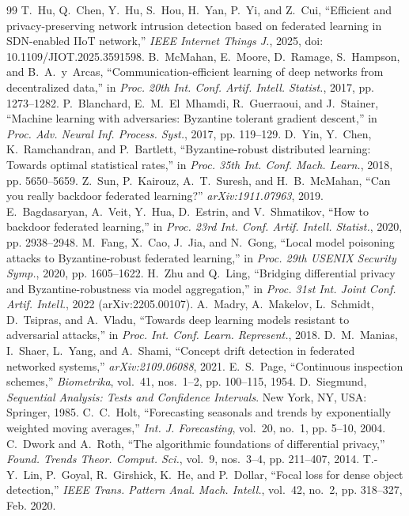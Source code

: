 \documentclass[journal]{IEEEtran}
\begin{document}
\begin{thebibliography}{99}
 T.~Hu, Q.~Chen, Y.~Hu, S.~Hou, H.~Yan, P.~Yi, and Z.~Cui, ``Efficient and privacy-preserving network intrusion detection based on federated learning in SDN-enabled IIoT network,'' \emph{IEEE Internet Things J.}, 2025, doi: 10.1109/JIOT.2025.3591598.
 B.~McMahan, E.~Moore, D.~Ramage, S.~Hampson, and B.~A.~y~Arcas, ``Communication-efficient learning of deep networks from decentralized data,'' in \emph{Proc. 20th Int. Conf. Artif. Intell. Statist.}, 2017, pp. 1273--1282.
 P.~Blanchard, E.~M.~El~Mhamdi, R.~Guerraoui, and J.~Stainer, ``Machine learning with adversaries: Byzantine tolerant gradient descent,'' in \emph{Proc. Adv. Neural Inf. Process. Syst.}, 2017, pp. 119--129.
 D.~Yin, Y.~Chen, K.~Ramchandran, and P.~Bartlett, ``Byzantine-robust distributed learning: Towards optimal statistical rates,'' in \emph{Proc. 35th Int. Conf. Mach. Learn.}, 2018, pp. 5650--5659.
 Z.~Sun, P.~Kairouz, A.~T.~Suresh, and H.~B.~McMahan, ``Can you really backdoor federated learning?'' \emph{arXiv:1911.07963}, 2019.
 E.~Bagdasaryan, A.~Veit, Y.~Hua, D.~Estrin, and V.~Shmatikov, ``How to backdoor federated learning,'' in \emph{Proc. 23rd Int. Conf. Artif. Intell. Statist.}, 2020, pp. 2938--2948.
 M.~Fang, X.~Cao, J.~Jia, and N.~Gong, ``Local model poisoning attacks to Byzantine-robust federated learning,'' in \emph{Proc. 29th USENIX Security Symp.}, 2020, pp. 1605--1622.
 H.~Zhu and Q.~Ling, ``Bridging differential privacy and Byzantine-robustness via model aggregation,'' in \emph{Proc. 31st Int. Joint Conf. Artif. Intell.}, 2022 (arXiv:2205.00107).
 A.~Madry, A.~Makelov, L.~Schmidt, D.~Tsipras, and A.~Vladu, ``Towards deep learning models resistant to adversarial attacks,'' in \emph{Proc. Int. Conf. Learn. Represent.}, 2018.
 D.~M.~Manias, I.~Shaer, L.~Yang, and A.~Shami, ``Concept drift detection in federated networked systems,'' \emph{arXiv:2109.06088}, 2021.
 E.~S.~Page, ``Continuous inspection schemes,'' \emph{Biometrika}, vol.~41, nos.~1--2, pp. 100--115, 1954.
 D.~Siegmund, \emph{Sequential Analysis: Tests and Confidence Intervals}. New York, NY, USA: Springer, 1985.
 C.~C.~Holt, ``Forecasting seasonals and trends by exponentially weighted moving averages,'' \emph{Int. J. Forecasting}, vol.~20, no.~1, pp. 5--10, 2004.
 C.~Dwork and A.~Roth, ``The algorithmic foundations of differential privacy,'' \emph{Found. Trends Theor. Comput. Sci.}, vol.~9, nos.~3--4, pp. 211--407, 2014.
 T.-Y.~Lin, P.~Goyal, R.~Girshick, K.~He, and P.~Dollar, ``Focal loss for dense object detection,'' \emph{IEEE Trans. Pattern Anal. Mach. Intell.}, vol.~42, no.~2, pp. 318--327, Feb. 2020.
\end{thebibliography}
\end{document}
